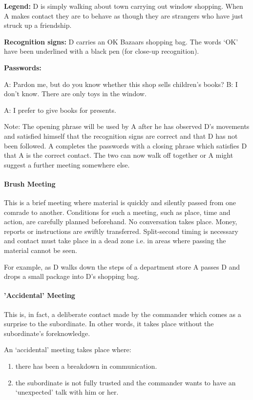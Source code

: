 \textbf{Legend:} D is simply walking about town carrying out window
shopping. When A makes contact they are to behave as though they are
strangers who have just struck up a friendship.

\textbf{Recognition signs:} D carries an OK Bazaars shopping bag. The
words `OK' have been underlined with a black pen (for close-up
recognition).

\textbf{Passwords:}

A: Pardon me, but do you know whether this shop sells children's books?
B: I don't know. There are only toys in the window.

A: I prefer to give books for presents.

Note: The opening phrase will be used by A after he has observed D's
movements and satisfied himself that the recognition signs are correct
and that D has not been followed. A completes the passwords with a
closing phrase which satisfies D that A is the correct contact. The two
can now walk off together or A might suggest a further meeting somewhere
else.

\paragraph{Brush Meeting}

This is a brief meeting where material is quickly and silently passed
from one comrade to another. Conditions for such a meeting, such as
place, time and action, are carefully planned beforehand. No
conversation takes place. Money, reports or instructions are swiftly
transferred. Split-second timing is necessary and contact must take
place in a dead zone i.e. in areas where passing the material cannot be
seen.

For example, as D walks down the steps of a department store A passes D
and drops a small package into D's shopping bag.

\paragraph{'Accidental' Meeting}

This is, in fact, a deliberate contact made by the commander which comes
as a surprise to the subordinate. In other words, it takes place without
the subordinate's foreknowledge.

An `accidental' meeting takes place where:

\begin{enumerate}
\tightlist
\item
  there has been a breakdown in communication.
\item
  the subordinate is not fully trusted and the commander wants to have
  an `unexpected' talk with him or her.
\end{enumerate}

